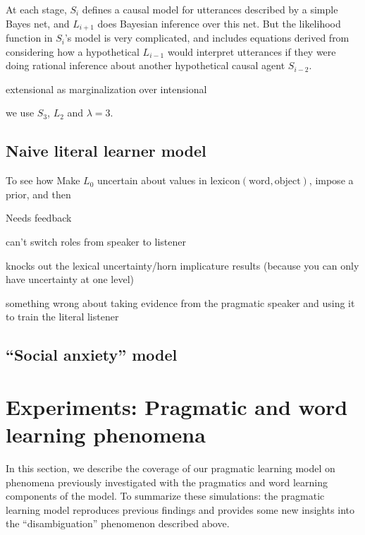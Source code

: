 \documentclass{article} %
\newcommand{\word}{\text{word}}
\newcommand{\obj}{\text{object}}
\newcommand{\lex}{\text{lexicon}}
\begin{document}
At each stage, $S_i$ defines a causal model for utterances described
by a simple Bayes net, and $L_{i+1}$ does Bayesian inference over this net. But the likelihood function in $S_i$'s model is very complicated, and includes equations derived from considering how a hypothetical $L_{i-1}$ would interpret utterances if they were doing rational inference about another hypothetical causal agent $S_{i-2}$.

extensional as marginalization over intensional


we use $S_3$, $L_2$ and $\lambda = 3$.

\subsection{Naive literal learner model}



To see how
Make $L_0$ uncertain about values in $\lex(\word, \obj)$, impose a prior, and then

Needs feedback

can't switch roles from speaker to listener

knocks out the lexical uncertainty/horn implicature results (because you can only have uncertainty at one level)

something wrong about taking evidence from the pragmatic speaker and using it to train the literal listener

\subsection{``Social anxiety'' model}

\section{Experiments: Pragmatic and word learning phenomena}

In this section, we describe the coverage of our pragmatic learning model on phenomena previously investigated with the pragmatics and word learning components of the model. To summarize these simulations: the pragmatic learning model reproduces previous findings and provides some new insights into the ``disambiguation'' phenomenon described above. 
\end{document}
